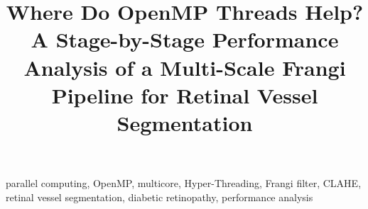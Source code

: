 \documentclass[conference]{IEEEtran}
\begin{document}
\title{Where Do OpenMP Threads Help? A Stage-by-Stage Performance Analysis of a Multi-Scale Frangi Pipeline
for Retinal Vessel Segmentation}

\author{
}

\maketitle



\begin{IEEEkeywords}
parallel computing, OpenMP, multicore, Hyper-Threading, Frangi filter, CLAHE, retinal vessel segmentation,
diabetic retinopathy, performance analysis
\end{IEEEkeywords}










\end{document}
